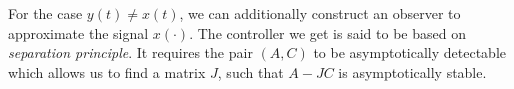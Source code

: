  




%
%
%

For the case $y(t) \neq x(t)$, we can additionally construct an observer to approximate the signal $x(\cdot)$. The  controller we get is said to be based on \textit{separation principle}.
It requires the pair $(A,C)$ to be asymptotically detectable 
which allows us to find a matrix $J$, such that $A - JC$ is asymptotically stable.

